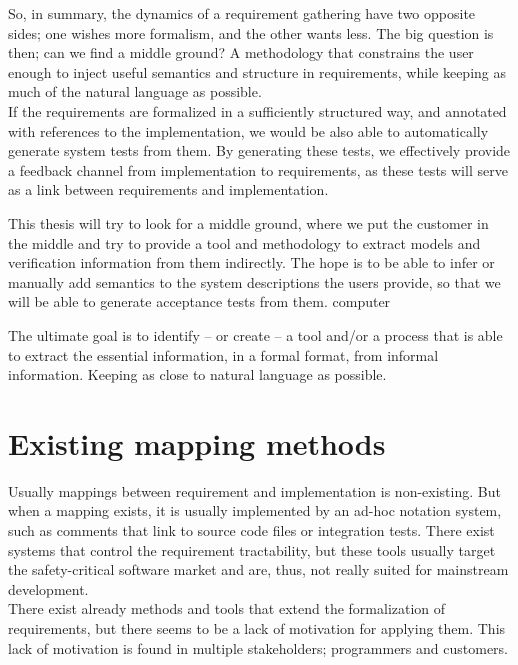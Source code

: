 So, in summary, the dynamics of a requirement gathering have two opposite sides; one wishes more formalism, and the other wants less. The big question is then; can we find a middle ground? A methodology that constrains the user enough to inject useful semantics and structure in requirements, while keeping as much of the natural language as possible.\\
If the requirements are formalized in a sufficiently structured way, and annotated with references to the implementation, we would be also able to automatically generate system tests from them. By generating these tests, we effectively provide a feedback channel from implementation to requirements, as these tests will serve as a link between requirements and implementation.

This thesis will try to look for a middle ground, where we put the customer in the middle and try to provide a tool and methodology to extract models and verification information from them indirectly. The hope is to be able to infer or manually add semantics to the system descriptions the users provide, so that we will be able to generate acceptance tests from them. computer

The ultimate goal is to identify -- or create --  a tool and/or a process that is able to extract the essential information, in a formal format, from informal information. Keeping as close to natural language as possible.

\section{Existing mapping methods}
Usually mappings between requirement and implementation is non-existing. But when a mapping exists, it is usually implemented by an ad-hoc notation system, such as comments that link to source code files or integration tests. There exist systems that control the requirement tractability, but these tools usually target the safety-critical software market and are, thus, not really suited for mainstream development.\\%

There exist already methods and tools that extend the formalization of requirements, but there seems to be a lack of motivation for applying them. This lack of motivation is found in multiple stakeholders; programmers and customers.

